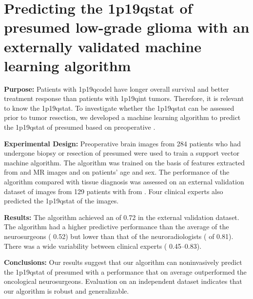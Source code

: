 
\chapter[Predicting the \acl{1p19qstat} of presumed low-grade glioma with an externally validated machine learning algorithm][SVM for 1p/19q prediction of LGG]{Predicting the \acl{1p19qstat} of presumed low-grade glioma with an externally validated machine learning algorithm}\label{chap:LGG1p19q}


\begin{ChapterAbstract}
    \textbf{Purpose:} Patients with \acl{1p19qcodel}  have longer overall survival and better treatment response than patients with \acl{1p19qint} \glspl{tumor}.
    Therefore, it is relevant to know the \acl{1p19qstat}.
    To investigate whether the \acl{1p19qstat} can be assessed prior to \gls{tumor} resection, we developed a machine learning algorithm to predict the \acl{1p19qstat} of presumed  based on preoperative .

    \textbf{Experimental Design:} Preoperative brain  images from 284 patients who had undergone biopsy or resection of presumed  were used to train a support vector machine algorithm.
    The algorithm was trained on the basis of features extracted from  and  MR images and on patients' age and sex.
    The performance of the algorithm compared with tissue diagnosis was assessed on an external validation dataset of  images from 129 patients with  from .
    Four clinical experts also predicted the \acl{1p19qstat} of the   images.

    \textbf{Results:} The algorithm achieved an  of \num{0.72} in the external validation dataset.
    The algorithm had a higher predictive performance than the average of the neurosurgeons ( \num{0.52}) but lower than that of the neuroradiologists ( of \num{0.81}).
    There was a wide variability between clinical experts ( \numrange{0.45}{0.83}).

    \textbf{Conclusions:} Our results suggest that our algorithm can noninvasively predict the \acl{1p19qstat} of presumed  with a performance that on average outperformed the oncological neurosurgeons.
    Evaluation on an independent dataset indicates that our algorithm is robust and generalizable.

\end{ChapterAbstract}

